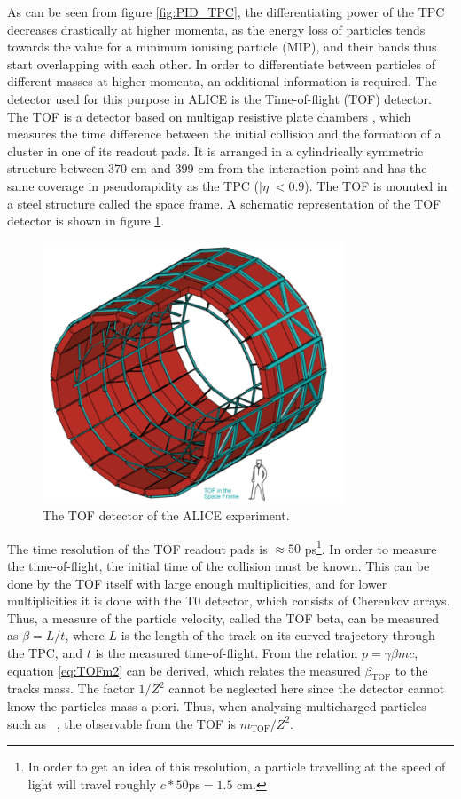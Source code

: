 As can be seen from figure \ref{fig:PID_TPC}, the differentiating power of the TPC decreases drastically at higher momenta, as the energy loss of particles tends towards the value for a minimum ionising particle (MIP), and their bands thus start overlapping with each other. In order to differentiate between particles of different masses at higher momenta, an additional information is required. The detector used for this purpose in ALICE is the Time-of-flight (TOF) detector. The TOF is a detector based on multigap resistive plate chambers \cite{ALICE_TOF_TDR}, which measures the time difference between the initial collision and the formation of a cluster in one of its readout pads. It is arranged in a cylindrically symmetric structure between 370 cm and 399 cm from the interaction point and has the same coverage in pseudorapidity as the TPC ($|\eta| < 0.9$). The TOF is mounted in a steel structure called the space frame\cite{ALICE_TOF_TDR, ALICE_overview}. A schematic representation of the TOF detector is shown in figure \ref{fig:TOF_schematic}. 

\begin{figure}
    \centering
    \includegraphics[width=0.8\textwidth]{figures/TOF.png}
    \caption{The TOF detector of the ALICE experiment.}
    \label{fig:TOF_schematic}
\end{figure}

The time resolution of the TOF readout pads is $\approx 50$ ps\footnote{In order to get an idea of this resolution, a particle travelling at the speed of light will travel roughly $c*50 \mathrm{ps} = 1.5$ cm.}. In order to measure the time-of-flight, the initial time of the collision must be known. This can be done by the TOF itself with large enough multiplicities, and for lower multiplicities it is done with the T0 detector, which consists of Cherenkov arrays.
Thus, a measure of the particle velocity, called the TOF beta, can be measured as $\beta = L/t$, where $L$ is the length of the track on its curved trajectory through the TPC, and $t$ is the measured time-of-flight. From the relation $p = \gamma \beta mc$, equation \ref{eq:TOFm2} can be derived, which relates the measured $\beta_{\mathrm{TOF}}$ to the tracks mass. The factor $1/Z^2$ cannot be neglected here since the detector cannot know the particles mass a piori. Thus, when analysing multicharged particles such as \ahe\ , the observable from the TOF is $m_{\mathrm{TOF}}/Z^2$. 

